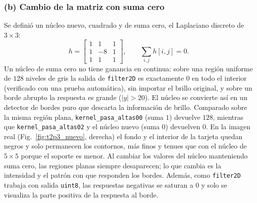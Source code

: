 \subsubsection{(b) Cambio de la matriz con suma cero}

Se definió un núcleo nuevo, cuadrado y de suma cero, el Laplaciano
discreto de $3\times3$:
\begin{equation}
h=\begin{bmatrix}1&1&1\\1&-8&1\\1&1&1\end{bmatrix},\qquad
\sum_{i,j}h[i,j]=0.
\end{equation}
Un núcleo de suma cero no tiene ganancia en continua: sobre una región
uniforme de $128$ niveles de gris la salida de \texttt{filter2D} es
exactamente $0$ en todo el interior (verificado con una prueba
automática), sin importar el brillo original, y sobre un borde abrupto la
respuesta es grande ($|y|>20$). El núcleo se convierte así en un detector
de bordes puro que descarta la información de brillo. Comparado sobre la
misma región plana, \texttt{kernel\_pasa\_altas00} (suma $1$) devuelve
$128$, mientras que \texttt{kernel\_pasa\_altas02} y el núcleo nuevo
(suma $0$) devuelven $0$. En la imagen real (Fig.~\ref{fig:t2p3_nuevo},
derecha) el fondo y el interior de la tarjeta quedan negros y solo
permanecen los contornos, más finos y tenues que con el núcleo de
$5\times5$ porque el soporte es menor. Al cambiar los valores del núcleo
manteniendo suma cero, las regiones planas siempre desaparecen; lo que
cambia es la intensidad y el patrón con que responden los bordes. Además,
como \texttt{filter2D} trabaja con salida \texttt{uint8}, las respuestas
negativas se saturan a $0$ y solo se visualiza la parte positiva de la
respuesta al borde.
